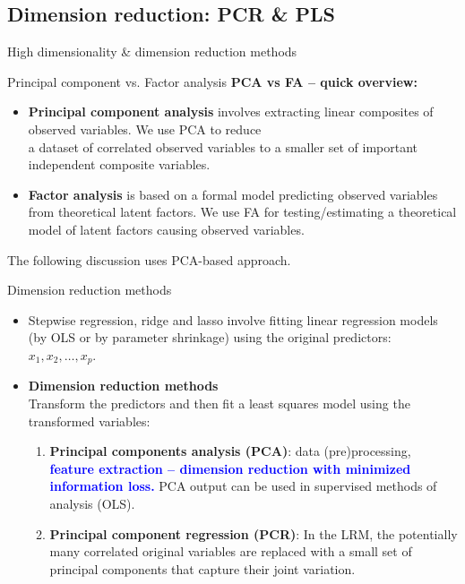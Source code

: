 \documentclass{beamer}
\begin{document}
\subsection{Dimension reduction: PCR \& PLS}
\begin{frame}{High dimensionality \& dimension reduction methods}
\end{frame}
\begin{frame}{Principal component vs. Factor analysis}
\textbf{PCA vs FA -- quick overview:}\\
\medskip
\begin{itemize}
\item \textbf{Principal component analysis} involves extracting linear composites of observed variables. We use PCA to reduce \\a dataset of correlated observed variables to a smaller set of important independent composite variables.
\bigskip
\item \textbf{Factor analysis} is based on a formal model predicting observed variables from theoretical latent factors. We use FA for testing/estimating a theoretical model of latent factors causing observed variables.
\end{itemize}
\bigskip
The following discussion uses PCA-based approach.
\end{frame}
\begin{frame}{Dimension reduction methods}
\begin{itemize}
\item Stepwise regression, ridge and lasso involve fitting linear regression models (by OLS or by parameter shrinkage) using the original predictors: $x_1, x_2, \dots , x_p$.
\medskip
\item \textbf{Dimension reduction methods}\\ \medskip Transform the
predictors and then fit a least squares model using the
transformed variables:
\begin{enumerate}
\bigskip
\item \textbf{Principal components analysis (PCA)}: data (pre)processing, \textcolor{blue}{\textbf{feature extraction -- dimension reduction with minimized information loss.}} PCA output can be used in supervised methods of analysis (OLS).
\bigskip
\item \textbf{Principal component regression (PCR)}:  In the LRM, the potentially many correlated original variables are replaced with a small set of principal components that capture their joint variation.
\end{enumerate}
\end{itemize}
\end{frame}
\end{document}
